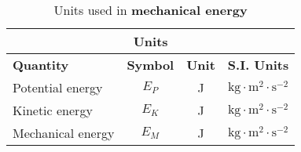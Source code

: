 \begin{table}[H]
\begin{center}
\begin{tabular}{|l|c|c|c|}\hline \hline 
\multicolumn{4}{|c|}{\textbf{Units}}\\ \hline \hline
\textbf{Quantity} & \textbf{Symbol} & \textbf{Unit} & \textbf{S.I. Units}\\ \hline
Potential energy & $E_{P}$ & J & $\text{kg} \cdot \text{m}^{2} \cdot \text{s}^{-2}$ \\ \hline
Kinetic energy & $E_{K}$ & J & $\text{kg} \cdot \text{m}^{2} \cdot \text{s}^{-2}$ \\ \hline
Mechanical energy & $E_{M}$ & J & $\text{kg} \cdot \text{m}^{2} \cdot \text{s}^{-2}$ \\ \hline
\end{tabular}
\end{center}
\caption{Units used in \textbf{mechanical energy} }
\label{table:electricity::units}
\end{table}
    \label{m38786*cid9}
